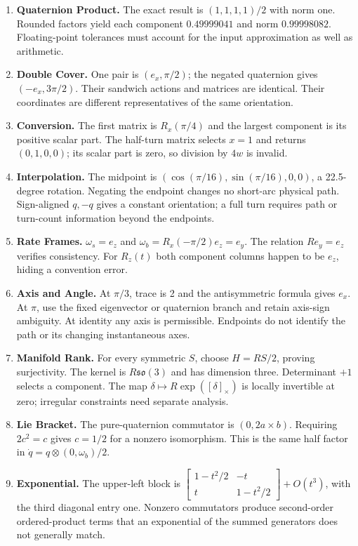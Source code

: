 \begin{enumerate}
\item \textbf{Quaternion Product.} The exact result is $(1,1,1,1)/2$ with norm one. Rounded factors yield each component $0.49999041$ and norm $0.99998082$. Floating-point tolerances must account for the input approximation as well as arithmetic.
\item \textbf{Double Cover.} One pair is $(e_x,\pi/2)$; the negated quaternion gives $(-e_x,3\pi/2)$. Their sandwich actions and matrices are identical. Their coordinates are different representatives of the same orientation.
\item \textbf{Conversion.} The first matrix is $R_x(\pi/4)$ and the largest component is its positive scalar part. The half-turn matrix selects $x=1$ and returns $(0,1,0,0)$; its scalar part is zero, so division by $4w$ is invalid.
\item \textbf{Interpolation.} The midpoint is $(\cos(\pi/16),\sin(\pi/16),0,0)$, a 22.5-degree rotation. Negating the endpoint changes no short-arc physical path. Sign-aligned $q,-q$ gives a constant orientation; a full turn requires path or turn-count information beyond the endpoints.
\item \textbf{Rate Frames.} $\omega_s=e_z$ and $\omega_b=R_x(-\pi/2)e_z=e_y$. The relation $Re_y=e_z$ verifies consistency. For $R_z(t)$ both component columns happen to be $e_z$, hiding a convention error.
\item \textbf{Axis and Angle.} At $\pi/3$, trace is 2 and the antisymmetric formula gives $e_x$. At $\pi$, use the fixed eigenvector or quaternion branch and retain axis-sign ambiguity. At identity any axis is permissible. Endpoints do not identify the path or its changing instantaneous axes.
\item \textbf{Manifold Rank.} For every symmetric $S$, choose $H=RS/2$, proving surjectivity. The kernel is $R\mathfrak{so}(3)$ and has dimension three. Determinant $+1$ selects a component. The map $\delta\mapsto R\exp([\delta]_\times)$ is locally invertible at zero; irregular constraints need separate analysis.
\item \textbf{Lie Bracket.} The pure-quaternion commutator is $(0,2a\times b)$. Requiring $2c^2=c$ gives $c=1/2$ for a nonzero isomorphism. This is the same half factor in $\dot q=q\otimes(0,\omega_b)/2$.
\item \textbf{Exponential.} The upper-left block is $\left[\begin{smallmatrix}1-t^2/2&-t\\t&1-t^2/2\end{smallmatrix}\right]+O(t^3)$, with the third diagonal entry one. Nonzero commutators produce second-order ordered-product terms that an exponential of the summed generators does not generally match.

\end{enumerate}
